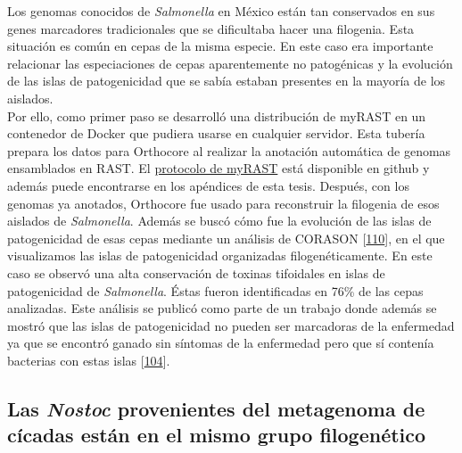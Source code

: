 \documentclass[12pt,twoside]{reedthesis}
\begin{document}
  Los genomas conocidos de \emph{Salmonella} en México están tan
  conservados en sus genes marcadores tradicionales que se dificultaba
  hacer una filogenia. Esta situación es común en cepas de la misma
  especie. En este caso era importante relacionar las especiaciones de
  cepas aparentemente no patogénicas y la evolución de las islas de
  patogenicidad que se sabía estaban presentes en la mayoría de los
  aislados.\\
  Por ello, como primer paso se desarrolló una distribución de myRAST en
  un contenedor de Docker que pudiera usarse en cualquier servidor. Esta
  tubería prepara los datos para Orthocore al realizar la anotación
  automática de genomas ensamblados en RAST. El
  \href{https://github.com/nselem/myrast}{protocolo de myRAST} está
  disponible en github y además puede encontrarse en los apéndices de esta
  tesis. Después, con los genomas ya anotados, Orthocore fue usado para
  reconstruir la filogenia de esos aislados de \emph{Salmonella}. Además
  se buscó cómo fue la evolución de las islas de patogenicidad de esas
  cepas mediante un análisis de CORASON
  {[}\protect\hyperlink{ref-navarro-munoz_computational_2018}{110}{]}, en
  el que visualizamos las islas de patogenicidad organizadas
  filogenéticamente. En este caso se observó una alta conservación de
  toxinas tifoidales en islas de patogenicidad de \emph{Salmonella}. Éstas
  fueron identificadas en 76\% de las cepas analizadas. Este análisis se
  publicó como parte de un trabajo donde además se mostró que las islas de
  patogenicidad no pueden ser marcadoras de la enfermedad ya que se
  encontró ganado sin síntomas de la enfermedad pero que sí contenía
  bacterias con estas islas
  {[}\protect\hyperlink{ref-delgado-suarez_whole_2018}{104}{]}.
  
  \subsection{\texorpdfstring{Las \emph{Nostoc} provenientes del
  metagenoma de cícadas están en el mismo grupo
  filogenético}{Las Nostoc provenientes del metagenoma de cícadas están en el mismo grupo filogenético}}\label{las-nostoc-provenientes-del-metagenoma-de-cicadas-estan-en-el-mismo-grupo-filogenetico}
  
\end{document}
